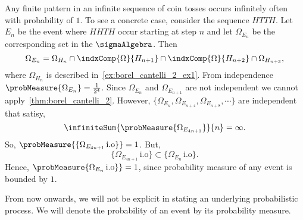 \begin{Example}
    Any finite pattern in an infinite sequence of coin tosses occurs infinitely often with probability of $1$.
    To see a concrete case, consider the sequence $HTTH$. Let $E_n$ be the event where $HHTH$ occur starting
    at step $n$ and let $\Omega_{E_n}$ be the corresponding set in the $\sigmaAlgebra$. Then 
    \[\Omega_{E_n} = \Omega_{H_n}\cap\indxComp{\Omega}{H_{n+1}}
	\cap\indxComp{\Omega}{H_{n+2}}\cap\Omega_{H_{n+3}},\]
    where $\Omega_{H_n}$ is described in~\ref{ex:borel_cantelli_2_ex1}. From independence 
    $\probMeasure{\Omega_{E_n}} = \frac{1}{2^4}$.
    Since $\Omega_{E_n}$ and $\Omega_{E_{n+1}}$ are not independent we cannot
    apply~\ref{thm:borel_cantelli_2}. However, $\lbrace \Omega_{E_n},
    \Omega_{E_{n+4}},\Omega_{E_{n+8}},\cdots\rbrace$ are independent that satisy,
    \[\infiniteSum{\probMeasure{\Omega_{E_{4n+1}}}}{n} = \infty.\]
    So, $\probMeasure{\lbrace \Omega_{E_{4n+1}}\,\text{i.o} \rbrace } = 1$. But,
    \[\lbrace \Omega_{E_{4n+1}}\,\text{i.o} \rbrace \subset 
	\lbrace \Omega_{E_{n}}\,\text{i.o} \rbrace.\]
    Hence, $\probMeasure{\Omega_{E_{n}}\,\text{i.o} \rbrace} = 1$, since probability measure of any event
    is bounded by $1$.
\end{Example}
From now onwards, we will not be explicit in stating an underlying probabilistic process. We will denote the
probability of an event by its probability measure.
